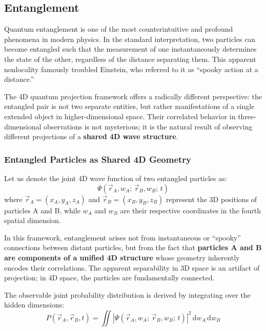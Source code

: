 \documentclass[12pt]{article}
\begin{document}
\subsection{Entanglement}

Quantum entanglement is one of the most counterintuitive and profound phenomena in modern physics. In the standard interpretation, two particles can become entangled such that the measurement of one instantaneously determines the state of the other, regardless of the distance separating them. This apparent nonlocality famously troubled Einstein, who referred to it as “spooky action at a distance.”

The 4D quantum projection framework offers a radically different perspective: the entangled pair is not two separate entities, but rather manifestations of a single extended object in higher-dimensional space. Their correlated behavior in three-dimensional observations is not mysterious; it is the natural result of observing different projections of a \textbf{shared 4D wave structure}.

\subsubsection{Entangled Particles as Shared 4D Geometry}

Let us denote the joint 4D wave function of two entangled particles as:
\begin{equation}
\Psi(\vec{r}_A, w_A;\, \vec{r}_B, w_B;\, t)
\end{equation}
where \( \vec{r}_A = (x_A, y_A, z_A) \) and \( \vec{r}_B = (x_B, y_B, z_B) \) represent the 3D positions of particles A and B, while \( w_A \) and \( w_B \) are their respective coordinates in the fourth spatial dimension.

In this framework, entanglement arises not from instantaneous or “spooky” connections between distant particles, but from the fact that \textbf{particles A and B are components of a unified 4D structure} whose geometry inherently encodes their correlations. The apparent separability in 3D space is an artifact of projection; in 4D space, the particles are fundamentally connected.

The observable joint probability distribution is derived by integrating over the hidden dimensions:
\begin{equation}
P(\vec{r}_A, \vec{r}_B, t) = \iint \left| \Psi(\vec{r}_A, w_A;\, \vec{r}_B, w_B;\, t) \right|^2 \, \mathrm{d}w_A \, \mathrm{d}w_B
\end{equation}
\end{document}
